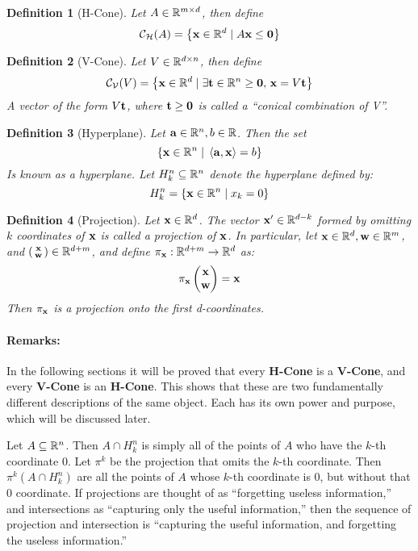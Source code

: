 \documentclass[a4,fleqn]{article}
\newtheorem{definition}{Definition}
\begin{document}
\begin{definition}[H-Cone]{
  Let $A \in \mathbb{R}^{m \times d}$, then define 
  \[\mathcal{C}_{\mathcal{H}}(A) = \left\{\mathbf{x} \in \mathbb{R}^d \;|\; A\mathbf{x} \leq \mathbf{0}\right\}\]
} \end{definition}

\begin{definition}[V-Cone]{
  Let $V \in \mathbb{R}^{d \times n}$, then define 
  \[\mathcal{C}_{\mathcal{V}}(V) = \left\{\mathbf{x} \in \mathbb{R}^d \;|\; \exists \mathbf{t} \in\mathbb{R}^n\geq \mathbf{0},\, \mathbf{x} = V\mathbf{t}\right\}\]
  A vector of the form $V\mathbf{t}$, where $\mathbf{t} \geq \mathbf{0}$ is called a ``conical combination of V''.
} \end{definition}

\begin{definition}[Hyperplane]{
  Let $\mathbf{a} \in \mathbb{R}^n, b \in \mathbb{R}$.  Then the set
  \[ \{\mathbf{x} \in \mathbb{R}^n \;|\; \left\langle \mathbf{a}, \mathbf{x} \right\rangle = b\} \]
  Is known as a hyperplane.  Let $H_{k}^{n} \subseteq \mathbb{R}^n$ denote the hyperplane defined by:
  \[H_{k}^{n} = \left\{\mathbf{x} \in \mathbb{R}^{n} \;|\; x_{k} = 0\right\}\]
} \end{definition}

\begin{definition}[Projection]{
  Let $\mathbf{x}\in\mathbb{R}^d$.  The vector $\mathbf{x}'\in\mathbb{R}^{d-k}$ formed by omitting $k$ coordinates of $\mathbf{x}$ is called a projection of $\mathbf{x}$.  In particular, let $\mathbf{x}\in\mathbb{R}^d, \mathbf{w}\in\mathbb{R}^m$, and $\left(\begin{smallmatrix}\mathbf{x} \\ \mathbf{w}\end{smallmatrix}\right) \in \mathbb{R}^{d+m}$, and define ${\pi_{\mathbf{x}} : \mathbb{R}^{d+m} \to \mathbb{R}^{d}}$ as:
  \[ \pi_{\x} \svec{\x}{\w} = \x \]
  Then $\pi_{\mathbf{x}}$ is a projection onto the first d-coordinates.
} \end{definition}

\paragraph{Remarks:}  In the following sections it will be proved that every \textbf{H-Cone} is a \textbf{V-Cone}, and every \textbf{V-Cone} is an \textbf{H-Cone}.  This shows that these are two fundamentally different descriptions of the same object.  Each has its own power and purpose, which will be discussed later.

Let $A \subseteq \mathbb{R}^n$.  Then $A \cap H_k^n$ is simply all of the points of $A$ who have the $k$-th coordinate $0$.  Let $\pi^k$ be the projection that omits the $k$-th coordinate.  Then $\pi^k(A \cap H_k^n)$ are all the points of $A$ whose $k$-th coordinate is $0$, but without that $0$ coordinate.  If projections are thought of as ``forgetting useless information,'' and intersections as ``capturing only the useful information,'' then the sequence of projection and intersection is ``capturing the useful information, and forgetting the useless information.''
\end{document}
